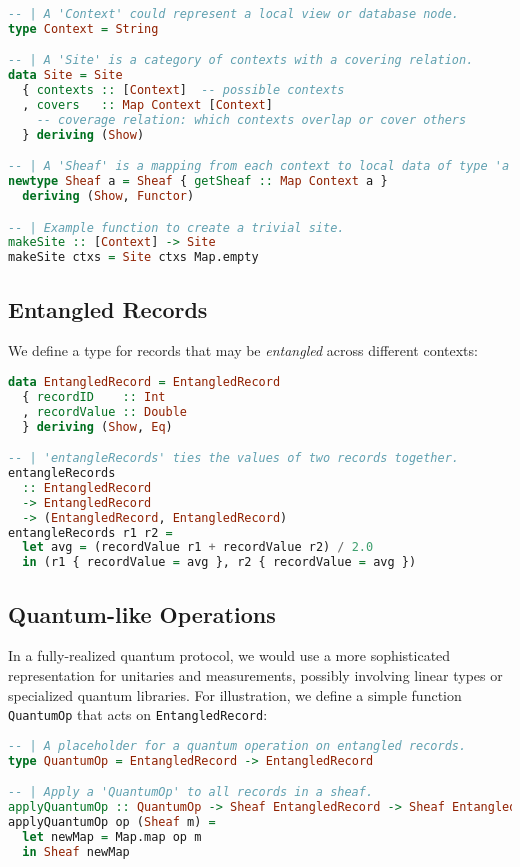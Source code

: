 \documentclass[11pt]{article}
\begin{document}
\begin{lstlisting}[language=Haskell, caption={Site and Sheaf definitions.}]
-- | A 'Context' could represent a local view or database node.
type Context = String

-- | A 'Site' is a category of contexts with a covering relation.
data Site = Site
  { contexts :: [Context]  -- possible contexts
  , covers   :: Map Context [Context]
    -- coverage relation: which contexts overlap or cover others
  } deriving (Show)

-- | A 'Sheaf' is a mapping from each context to local data of type 'a'.
newtype Sheaf a = Sheaf { getSheaf :: Map Context a }
  deriving (Show, Functor)

-- | Example function to create a trivial site.
makeSite :: [Context] -> Site
makeSite ctxs = Site ctxs Map.empty
\end{lstlisting}

\subsection{Entangled Records}
We define a type for records that may be \emph{entangled} across different contexts:

\begin{lstlisting}[language=Haskell, caption={Entangled record type and a simple entangling function.}]
data EntangledRecord = EntangledRecord
  { recordID    :: Int
  , recordValue :: Double
  } deriving (Show, Eq)

-- | 'entangleRecords' ties the values of two records together.
entangleRecords
  :: EntangledRecord
  -> EntangledRecord
  -> (EntangledRecord, EntangledRecord)
entangleRecords r1 r2 =
  let avg = (recordValue r1 + recordValue r2) / 2.0
  in (r1 { recordValue = avg }, r2 { recordValue = avg })
\end{lstlisting}

\subsection{Quantum-like Operations}
In a fully-realized quantum protocol, we would use a more sophisticated representation for unitaries and measurements, possibly involving linear types or specialized quantum libraries. For illustration, we define a simple function \texttt{QuantumOp} that acts on \texttt{EntangledRecord}:

\begin{lstlisting}[language=Haskell, caption={A simplified quantum operation.}]
-- | A placeholder for a quantum operation on entangled records.
type QuantumOp = EntangledRecord -> EntangledRecord

-- | Apply a 'QuantumOp' to all records in a sheaf.
applyQuantumOp :: QuantumOp -> Sheaf EntangledRecord -> Sheaf EntangledRecord
applyQuantumOp op (Sheaf m) =
  let newMap = Map.map op m
  in Sheaf newMap
\end{lstlisting}
\end{document}
